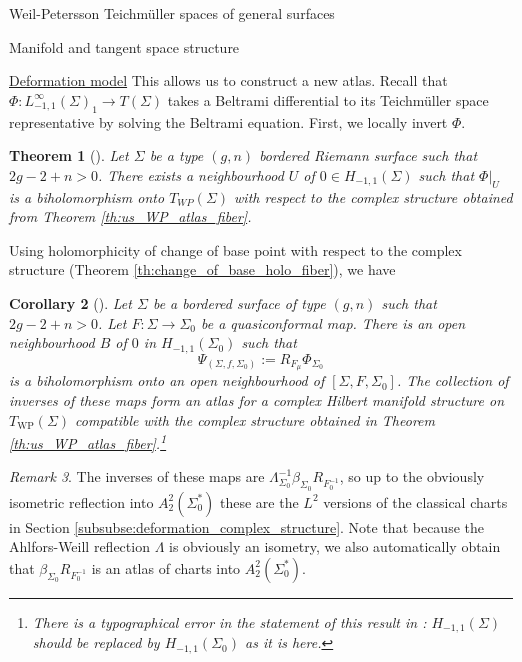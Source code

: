 \documentclass[12pt]{amsart}
\newcommand{\riem}{\Sigma}  %
\theoremstyle{plain}
\newtheorem{theorem}{Theorem}[section]
\newtheorem{corollary}[theorem]{Corollary}
\theoremstyle{definition}
\theoremstyle{remark}
\newtheorem{remark}[theorem]{Remark}
\numberwithin{equation}{section} %
\numberwithin{figure}{section} %
\begin{document}
\begin{section}{Weil-Petersson Teichm\"uller spaces of general surfaces}
\begin{subsection}{Manifold and tangent space structure}
\begin{subsubsection}{{\underline{Deformation model}}}
  This allows us to construct a new atlas. Recall that $\Phi:L^\infty_{-1,1}(\riem)_1 \rightarrow T(\riem)$ takes a Beltrami differential to its Teichm\"uller space representative by solving the Beltrami equation. First, we locally invert $\Phi$. 
  \begin{theorem}[\cite{RSS_WP2}] \label{th:us_WP_atlas_deformation}
   Let $\riem$ be a type $(g,n)$ bordered Riemann surface such that $2g-2+n>0$. There exists a neighbourhood $U$ of $0 \in H_{-1,1}(\riem)$ such that $\left. \Phi \right|_{U}$ is a biholomorphism onto $T_{WP}(\riem)$ with respect to the complex structure obtained from \emph{Theorem \ref{th:us_WP_atlas_fiber}}. 
  \end{theorem}
  Using holomorphicity of change of base point with respect to the complex structure (Theorem \ref{th:change_of_base_holo_fiber}), we have 
  \begin{corollary}[\cite{RSS_WP_arxiv,RSS_WP2}]
   Let $\riem$ be a bordered surface of type $(g,n)$ such that $2g-2+n>0$. Let $F:\riem \rightarrow \riem_0$ be a quasiconformal map. There is an open neighbourhood $B$ of $0$ in $H_{-1,1}(\riem_0)$ such that 
   \[   \Psi_{(\riem,f,\riem_0)} := R_{F_\mu} \Phi_{\riem_0}   \]
   is a biholomorphism onto an open neighbourhood of $[\riem,F,\riem_0]$. The collection of inverses of these maps form an atlas for a complex Hilbert manifold structure on $T_{\mathrm{WP}}(\riem)$ compatible with the complex structure obtained in Theorem \ref{th:us_WP_atlas_fiber}.\footnote{There is a typographical error in the statement of this result in \cite[Theorem 4.8]{RSS_WP2}: $H_{-1,1}(\riem)$ should be replaced by $H_{-1,1}(\riem_0)$ as it is here.} 
  \end{corollary}
  \begin{remark} 
   The inverses of these maps are $\Lambda^{-1}_{\riem_0} \beta_{\riem_0} R_{F_{0}^{-1}}$, so up to the obviously isometric reflection into $A^2_2(\riem_0^*)$ these are the $L^2$ versions of the classical charts in Section \ref{subsubse:deformation_complex_structure}.  Note that because the Ahlfors-Weill reflection $\Lambda$ is obviously an isometry, we also automatically obtain that $\beta_{\riem_0} R_{F_0^{-1}}$ is an atlas of charts into $A_2^2(\riem_0^*)$. 
  \end{remark}



\end{subsubsection}
\end{subsection}
\end{section}
\end{document}
